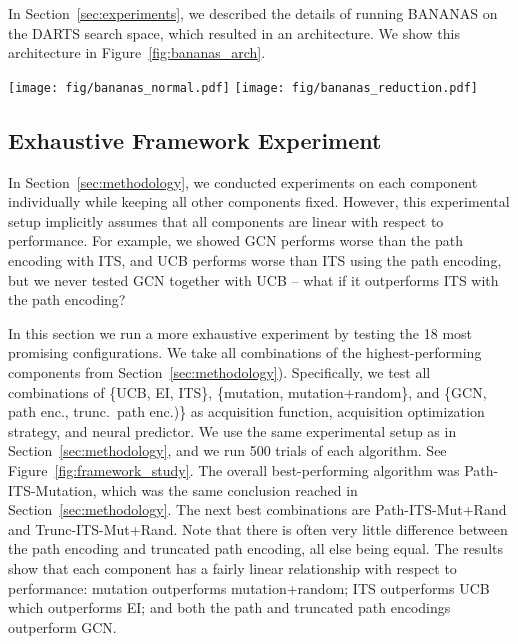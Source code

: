 \documentclass[11pt]{article}
\numberwithin{equation}{section}
\numberwithin{figure}{section}
\theoremstyle{plain}
\theoremstyle{definition}
\newcounter{Frame}
\begin{document}
In Section~\ref{sec:experiments}, we described the details of running
BANANAS on the DARTS search space, which resulted in an architecture.
We show this architecture in Figure~\ref{fig:bananas_arch}.

\begin{figure*}
  \centering
    \texttt{[image: fig/bananas\_normal.pdf]}
\texttt{[image: fig/bananas\_reduction.pdf]}
\caption{The best neural architecture found by BANANAS in the DARTS space. Normal cell (left) and reduction cell (right).}
  \label{fig:bananas_arch}
\end{figure*}

\subsection{Exhaustive Framework Experiment}\label{app:experiments:exhaustive}
In Section~\ref{sec:methodology}, we conducted experiments on each component
individually while keeping all other components fixed.
However, this experimental setup implicitly assumes that all components are linear with
respect to performance. For example, we showed GCN performs worse than 
the path encoding with ITS, and UCB performs worse than ITS using the path encoding, but we never tested GCN together with UCB -- what if it outperforms ITS with the path encoding?

In this section we run a more exhaustive experiment by testing the 18 most promising
configurations. 
We take all combinations of the highest-performing components
from Section~\ref{sec:methodology}).
Specifically, we test all combinations of \{UCB, EI, ITS\},
\{mutation, mutation+random\}, and 
\{GCN, path enc., trunc.\ path enc.)\}
as acquisition function, acquisition optimization strategy, and neural predictor.
We use the same experimental setup as in Section~\ref{sec:methodology}, and we run
500 trials of each algorithm.
See Figure~\ref{fig:framework_study}.
The overall best-performing algorithm was Path-ITS-Mutation, which was the same conclusion
reached in Section~\ref{sec:methodology}.
The next best combinations are Path-ITS-Mut+Rand and Trunc-ITS-Mut+Rand.
Note that there is often very little difference between the path encoding and truncated path encoding,
all else being equal.
The results show that each component has a fairly linear relationship with respect to performance:
mutation outperforms mutation+random; ITS outperforms UCB which outperforms EI;
and both the path and truncated path encodings outperform GCN.
\end{document}
